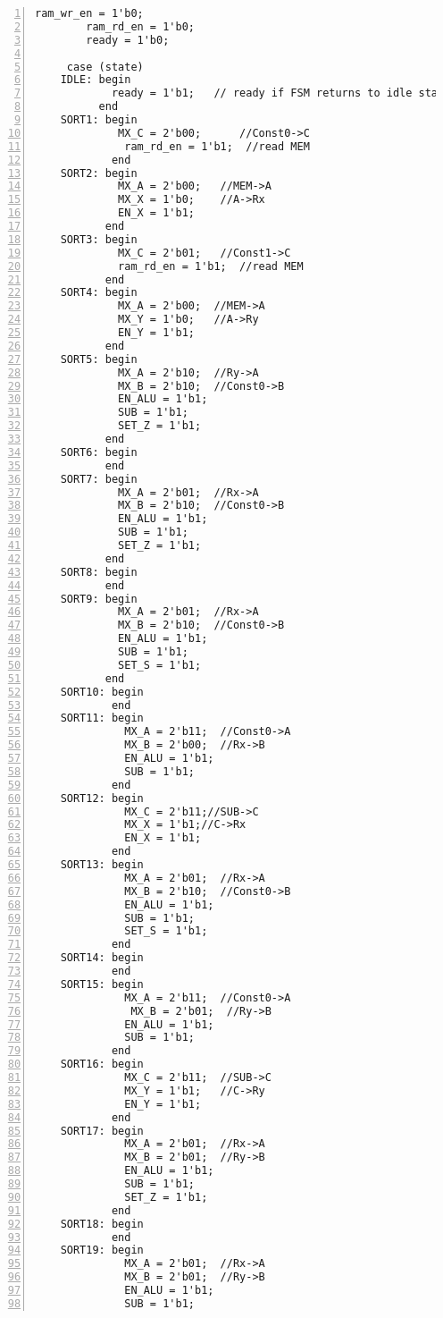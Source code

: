 \begin{lstlisting}[numbers=left,xleftmargin=1em, multicols=2,frame=leftline, basicstyle = \small\ttfamily]
        ram_wr_en = 1'b0;
        ram_rd_en = 1'b0;
        ready = 1'b0;
    
     case (state)
    IDLE: begin
            ready = 1'b1;   // ready if FSM returns to idle state
          end
    SORT1: begin
             MX_C = 2'b00;      //Const0->C
              ram_rd_en = 1'b1;  //read MEM
            end
    SORT2: begin			 
             MX_A = 2'b00;   //MEM->A
             MX_X = 1'b0;    //A->Rx
             EN_X = 1'b1;
           end
    SORT3: begin
             MX_C = 2'b01;   //Const1->C
             ram_rd_en = 1'b1;  //read MEM
           end
    SORT4: begin
             MX_A = 2'b00;  //MEM->A
             MX_Y = 1'b0;   //A->Ry
             EN_Y = 1'b1;
           end
    SORT5: begin
             MX_A = 2'b10;  //Ry->A
             MX_B = 2'b10;  //Const0->B
             EN_ALU = 1'b1;
             SUB = 1'b1;
             SET_Z = 1'b1;
           end
    SORT6: begin
           end
    SORT7: begin
             MX_A = 2'b01;  //Rx->A
             MX_B = 2'b10;  //Const0->B
             EN_ALU = 1'b1;
             SUB = 1'b1;
             SET_Z = 1'b1;
           end
    SORT8: begin
           end
    SORT9: begin
             MX_A = 2'b01;  //Rx->A
             MX_B = 2'b10;  //Const0->B
             EN_ALU = 1'b1;
             SUB = 1'b1;
             SET_S = 1'b1;
           end
    SORT10: begin
            end
    SORT11: begin
              MX_A = 2'b11;  //Const0->A
              MX_B = 2'b00;  //Rx->B
              EN_ALU = 1'b1;
              SUB = 1'b1;
            end
    SORT12: begin
              MX_C = 2'b11;//SUB->C
              MX_X = 1'b1;//C->Rx
              EN_X = 1'b1;				 
            end
    SORT13: begin
              MX_A = 2'b01;  //Rx->A
              MX_B = 2'b10;  //Const0->B
              EN_ALU = 1'b1;
              SUB = 1'b1;
              SET_S = 1'b1;
            end
    SORT14: begin
            end
    SORT15: begin
              MX_A = 2'b11;  //Const0->A
               MX_B = 2'b01;  //Ry->B
              EN_ALU = 1'b1;
              SUB = 1'b1;
            end
    SORT16: begin
              MX_C = 2'b11;  //SUB->C
              MX_Y = 1'b1;   //C->Ry
              EN_Y = 1'b1;
            end
    SORT17: begin
              MX_A = 2'b01;  //Rx->A
              MX_B = 2'b01;  //Ry->B
              EN_ALU = 1'b1;
              SUB = 1'b1;
              SET_Z = 1'b1;
            end
    SORT18: begin
            end
    SORT19: begin
              MX_A = 2'b01;  //Rx->A
              MX_B = 2'b01;  //Ry->B
              EN_ALU = 1'b1;
              SUB = 1'b1;

\end{lstlisting}
